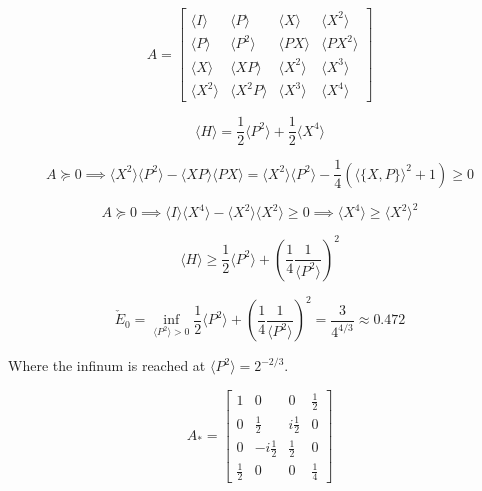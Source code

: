 \documentclass{article}
\theoremstyle{definition}
\begin{document}
\begin{equation}
    A=
    \begin{bmatrix}
        \langle I \rangle & \langle P \rangle & \langle X \rangle & \langle X^2 \rangle \\
        \langle P \rangle & \langle P^2 \rangle & \langle PX \rangle & \langle PX^2 \rangle \\
        \langle X \rangle & \langle XP \rangle & \langle X^2 \rangle & \langle X^3 \rangle \\
        \langle X^2 \rangle & \langle X^2P \rangle & \langle X^3 \rangle & \langle X^4 \rangle 
    \end{bmatrix}
\end{equation}

\begin{equation}
    \langle H \rangle = \frac{1}{2} \langle P^2 \rangle + \frac{1}{2} \langle X^4 \rangle
\end{equation}

\begin{equation}
    A \succcurlyeq 0
    \implies
    \langle X^2 \rangle \langle P^2 \rangle - \langle XP \rangle \langle PX \rangle
    =
    \langle X^2 \rangle \langle P^2 \rangle - \frac{1}{4} (\langle \{X,P\} \rangle^2+1)
    \ge0
\end{equation}

\begin{equation}
    A \succcurlyeq 0
    \implies
    \langle I \rangle \langle X^4 \rangle - \langle X^2 \rangle \langle X^2 \rangle
    \ge0
    \implies
    \langle X^4 \rangle
    \ge
    \langle X^2 \rangle^2
\end{equation}

\begin{equation}
    \langle H \rangle \ge \frac{1}{2} \langle P^2 \rangle + 
    \left ( \frac{1}{4} \frac{1}{\langle P^2 \rangle } \right )^2
\end{equation}

\begin{equation}
    \check{E}_0
    =
    \inf_{\langle P^2 \rangle >0} 
    \frac{1}{2} \langle P^2 \rangle + 
    \left ( \frac{1}{4} \frac{1}{\langle P^2 \rangle } \right )^2
    =
    \frac{3}{4^{4/3}}
    \approx
    0.472
\end{equation}

Where the infinum is reached at $\langle P^2 \rangle=2^{-2/3}$.

\begin{equation}
    A_*=
    \begin{bmatrix}
        1 & 0 & 0 & \frac{1}{2} \\
        0 & \frac{1}{2} & i \frac{1}{2} & 0 \\
        0 & -i \frac{1}{2} & \frac{1}{2} & 0 \\
        \frac{1}{2} & 0 & 0 & \frac{1}{4} 
    \end{bmatrix}
\end{equation}
\end{document}
